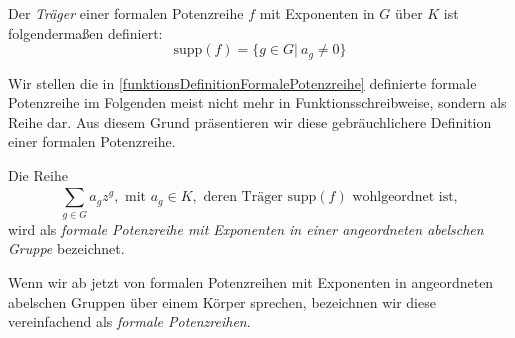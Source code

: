 

\begin{defn}\label{TraegerFormalePotenzreihe}
Der \textit{Träger} einer formalen Potenzreihe $f$ mit Exponenten in $G$ über $K$ ist folgendermaßen definiert: 
\[ \text{supp}(f) = \lbrace g \in G \vert ~ a_g \neq 0\rbrace\]
\end{defn}
%
%
%
Wir stellen die in \ref{funktionsDefinitionFormalePotenzreihe} definierte formale Potenzreihe im Folgenden meist nicht mehr in Funktionsschreibweise, sondern als Reihe dar. Aus diesem Grund präsentieren wir diese gebräuchlichere Definition einer formalen Potenzreihe.
\begin{defn}
Die Reihe 
\[\sum_{g \in G}^{}a_g z^g, \text{ mit } a_g \in K, \text{ deren Träger supp}(f) \text{ wohlgeordnet ist}, \]
wird als \textit{formale Potenzreihe mit Exponenten in einer angeordneten abelschen Gruppe} bezeichnet.
\end{defn}
%
%
% 
%
%
%
\begin{nota}
Wenn wir ab jetzt von formalen Potenzreihen mit Exponenten in angeordneten abelschen Gruppen über einem Körper sprechen, bezeichnen wir diese vereinfachend als \textit{formale Potenzreihen}.
\end{nota}
%
%
%
%
%
%
%
